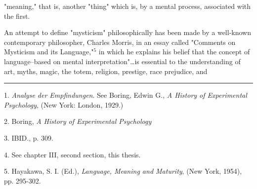 "meaning," that is, another "thing" which is, by a mental
process, associated with the first.\par
\vspace*{0.5\baselineskip}
An attempt to define "mysticism" philosophically has
been made by a well-known contemporary philosopher, Charles
Morris, in an essay called "Comments on Mysticism and its Language,"$^{5}$ in
which he explains his belief that the concept of language--based on
mental interpretation"\dots is essential to the understanding of art,
myths, magic, the totem, religion, prestige, race prejudice, and\linebreak
\null\par
\vspace*{-\baselineskip}
\vspace*{\fill}
\noindent\rule{0.25\textwidth}{0.4pt}\par
1. \textit{Analyse der Empfindungen}. See Boring, Edwin G., \textit{A History of Experimental Psychology},
(New York: London, 1929.)\par
2. Boring, \textit{A History of Experimental Psychology}\par
3. IBID., p. 309.\par
4. See chapter III, second section, this thesis.\par
5. Hayakawa, S. I. (Ed.), \textit{Language, Meaning and Maturity}, (New York, 1954), pp. 295-302.\par

\newpage

